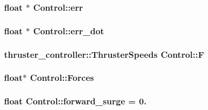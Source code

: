 \subsubsection[{\texorpdfstring{err}{err}}]{\setlength{\rightskip}{0pt plus 5cm}float $\ast$ Control\+::err\hspace{0.3cm}{\ttfamily [private]}}\hypertarget{classControl_a79e253da9e02d0b1c9bf35824c966cb5}{}\label{classControl_a79e253da9e02d0b1c9bf35824c966cb5}
\subsubsection[{\texorpdfstring{err\+\_\+dot}{err_dot}}]{\setlength{\rightskip}{0pt plus 5cm}float $\ast$ Control\+::err\+\_\+dot\hspace{0.3cm}{\ttfamily [private]}}\hypertarget{classControl_aef9f81ebc43231e739a2e58eb6b22605}{}\label{classControl_aef9f81ebc43231e739a2e58eb6b22605}
\subsubsection[{\texorpdfstring{F}{F}}]{\setlength{\rightskip}{0pt plus 5cm}thruster\+\_\+controller\+::\+Thruster\+Speeds Control\+::F\hspace{0.3cm}{\ttfamily [private]}}\hypertarget{classControl_a812e1016b531c2efae35d17b03ec34eb}{}\label{classControl_a812e1016b531c2efae35d17b03ec34eb}
\subsubsection[{\texorpdfstring{Forces}{Forces}}]{\setlength{\rightskip}{0pt plus 5cm}float$\ast$ Control\+::\+Forces\hspace{0.3cm}{\ttfamily [private]}}\hypertarget{classControl_a9d6bd0b67c1a539e3427a6bc87c71939}{}\label{classControl_a9d6bd0b67c1a539e3427a6bc87c71939}
\subsubsection[{\texorpdfstring{forward\+\_\+surge}{forward_surge}}]{\setlength{\rightskip}{0pt plus 5cm}float Control\+::forward\+\_\+surge = 0.\hspace{0.3cm}{\ttfamily [private]}}\hypertarget{classControl_af4f6b06288fafd78cd2cb384a1a16310}{}\label{classControl_af4f6b06288fafd78cd2cb384a1a16310}
